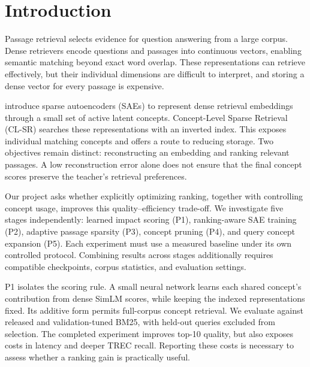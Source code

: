 \section{Introduction}
Passage retrieval selects evidence for question answering from a large corpus.
Dense retrievers encode questions and passages into continuous vectors, enabling
semantic matching beyond exact word overlap. These representations can retrieve
effectively, but their individual dimensions are difficult to interpret, and
storing a dense vector for every passage is expensive.

\citet{park-etal-2025-decoding} introduce sparse autoencoders (SAEs) to represent
dense retrieval embeddings through a small set of active latent concepts.
Concept-Level Sparse Retrieval (CL-SR) searches these representations with an
inverted index. This exposes individual matching concepts and offers a route
to reducing storage. Two objectives remain distinct: reconstructing an embedding
and ranking relevant passages. A low reconstruction error alone does not ensure
that the final concept scores preserve the teacher's retrieval preferences.

Our project asks whether explicitly optimizing ranking, together with controlling
concept usage, improves this quality--efficiency trade-off. We investigate five
stages independently: learned impact scoring (P1), ranking-aware SAE training
(P2), adaptive passage sparsity (P3), concept pruning (P4), and query concept
expansion (P5). Each experiment must use a measured baseline under its own
controlled protocol. Combining results across stages additionally requires
compatible checkpoints, corpus statistics, and evaluation settings.

P1 isolates the scoring rule. A small neural network learns each shared concept's
contribution from dense SimLM scores, while keeping the indexed representations
fixed. Its additive form permits full-corpus concept retrieval. We evaluate
against released and validation-tuned BM25, with held-out queries excluded from
selection. The completed experiment improves top-10 quality, but also exposes
costs in latency and deeper TREC recall. Reporting these costs is necessary to
assess whether a ranking gain is practically useful.
